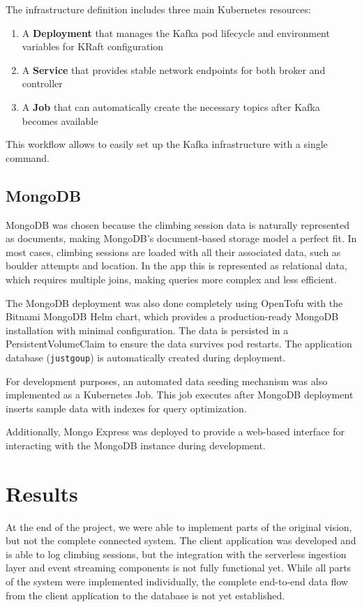 \documentclass[12pt,a4paper,onecolumn,twoside]{tau-class/tau}
\begin{document}
The infrastructure definition includes three main Kubernetes resources:

\begin{enumerate}
    \item A \textbf{Deployment} that manages the Kafka pod lifecycle and environment variables for KRaft configuration
    \item A \textbf{Service} that provides stable network endpoints for both broker and controller
    \item A \textbf{Job} that can automatically create the necessary topics after Kafka becomes available
\end{enumerate}

This workflow allows to easily set up the Kafka infrastructure with a single command.

\subsection{MongoDB}

MongoDB was chosen because the climbing session data is naturally represented as documents, making MongoDB's document-based storage model a perfect fit. In most cases, climbing sessions are loaded with all their associated data, such as boulder attempts and location. In the app this is represented as relational data, which requires multiple joins, making queries more complex and less efficient.

The MongoDB deployment was also done completely using OpenTofu with the Bitnami MongoDB Helm chart, which provides a production-ready MongoDB installation with minimal configuration. The data is persisted in a PersistentVolumeClaim to ensure the data survives pod restarts. The application database (\texttt{justgoup}) is automatically created during deployment.

For development purposes, an automated data seeding mechanism was also implemented as a Kubernetes Job. This job executes after MongoDB deployment inserts sample data with indexes for query optimization.

Additionally, Mongo Express was deployed to provide a web-based interface for interacting with the MongoDB instance during development.

\section{Results}

At the end of the project, we were able to implement parts of the original vision, but not the complete connected system. The client application was developed and is able to log climbing sessions, but the integration with the serverless ingestion layer and event streaming components is not fully functional yet. While all parts of the system were implemented individually, the complete end-to-end data flow from the client application to the database is not yet established.
\end{document}
